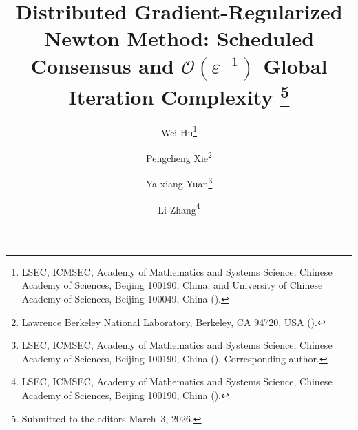 \newcommand{\creflastconjunction}{, and~}




\title{Distributed Gradient-Regularized Newton Method:
	Scheduled Consensus and \texorpdfstring{$\mathcal{O}(\varepsilon^{-1})$}{O(eps\^{}-1)} Global Iteration Complexity%
	\thanks{Submitted to the editors March~3, 2026.
		}}

\author{
	Wei Hu\thanks{
		LSEC, ICMSEC, Academy of Mathematics and Systems Science,
		Chinese Academy of Sciences, Beijing 100190, China;
		and University of Chinese Academy of Sciences, Beijing 100049, China
		().
	}
	\and
	Pengcheng Xie\thanks{
		Lawrence Berkeley National Laboratory,
		Berkeley, CA 94720, USA
		().
	}
	\and
	Ya-xiang Yuan\thanks{
		LSEC, ICMSEC, Academy of Mathematics and Systems Science,
		Chinese Academy of Sciences, Beijing 100190, China
		().
		Corresponding author.
	}
	\and
	Li Zhang\thanks{
		LSEC, ICMSEC, Academy of Mathematics and Systems Science,
		Chinese Academy of Sciences, Beijing 100190, China
		().
	}
}

